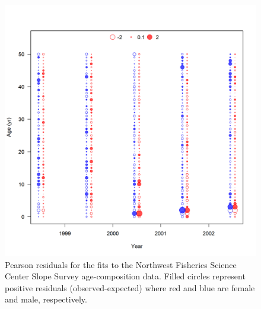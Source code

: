 \documentclass[11pt,
  english,
  a4paper,
]{article}
\begin{document}
\begin{figure}
\centering
\includegraphics[width=1\textwidth,height=1\textheight]{figs/comp_agefit_residsflt7mkt0.png}
\caption{Pearson residuals for the fits to the Northwest Fisheries Science Center Slope Survey age-composition data. Filled circles represent positive residuals (observed-expected) where red and blue are female and male, respectively. \label{fig:acomp_resid_7}}
\end{figure}

\tagmcend\tagstructend

\end{document}

